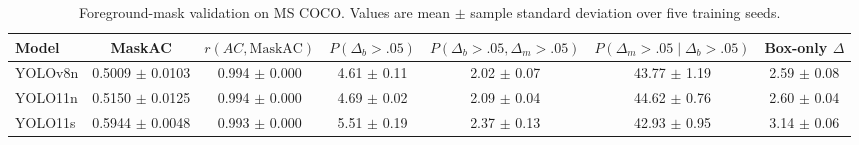 \begin{table}[t]
\centering
\caption{Foreground-mask validation on MS COCO. Values are mean $\pm$ sample standard deviation over five training seeds.}
\label{tab:mask_grounded_validity}
\begin{tabular}{lcccccc}
\hline
Model & MaskAC & $r(AC,\mathrm{MaskAC})$ & $P(\Delta_b>.05)$ & $P(\Delta_b>.05,\Delta_m>.05)$ & $P(\Delta_m>.05\mid\Delta_b>.05)$ & Box-only $\Delta$ \\
\hline
YOLOv8n & 0.5009 $\pm$ 0.0103 & 0.994 $\pm$ 0.000 & 4.61 $\pm$ 0.11 & 2.02 $\pm$ 0.07 & 43.77 $\pm$ 1.19 & 2.59 $\pm$ 0.08 \\
YOLO11n & 0.5150 $\pm$ 0.0125 & 0.994 $\pm$ 0.000 & 4.69 $\pm$ 0.02 & 2.09 $\pm$ 0.04 & 44.62 $\pm$ 0.76 & 2.60 $\pm$ 0.04 \\
YOLO11s & 0.5944 $\pm$ 0.0048 & 0.993 $\pm$ 0.000 & 5.51 $\pm$ 0.19 & 2.37 $\pm$ 0.13 & 42.93 $\pm$ 0.95 & 3.14 $\pm$ 0.06 \\
\hline
\end{tabular}
\end{table}
